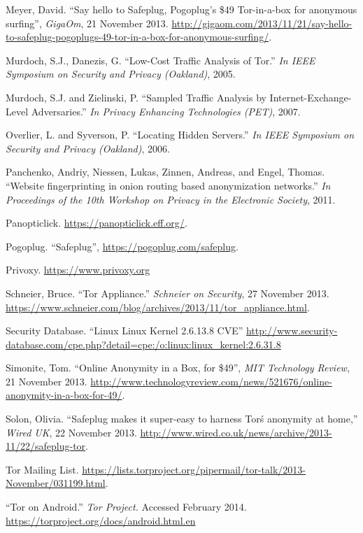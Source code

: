\documentclass[conference]{IEEEtran}
\begin{document}
\begin{thebibliography}{1}
 Meyer, David. ``Say hello to Safeplug, Pogoplug’s \$49 Tor-in-a-box for anonymous surfing'', \emph{GigaOm}, 21 November 2013. \url{http://gigaom.com/2013/11/21/say-hello-to-safeplug-pogoplugs-49-tor-in-a-box-for-anonymous-surfing/}.

 Murdoch, S.J., Danezis, G.  ``Low-Cost Traffic Analysis of Tor.'' \emph{In IEEE Symposium on Security and Privacy (Oakland)}, 2005.

 Murdoch, S.J. and Zielinski, P.  ``Sampled Traffic Analysis by Internet-Exchange-Level Adversaries.'' \emph{In Privacy Enhancing Technologies (PET)}, 2007.

 Overlier, L. and Syverson, P.  ``Locating Hidden Servers.'' \emph{In IEEE Symposium on Security and Privacy (Oakland)}, 2006.

 Panchenko, Andriy, Niessen, Lukas, Zinnen, Andreas, and Engel, Thomas.  ``Website fingerprinting in onion routing based anonymization networks.'' \emph{In Proceedings of the 10th Workshop on Privacy in the Electronic Society}, 2011.

 Panopticlick. \url{https://panopticlick.eff.org/}.

 Pogoplug. ``Safeplug'', \url{https://pogoplug.com/safeplug}.

 Privoxy. \url{https://www.privoxy.org}

 Schneier, Bruce. ``Tor Appliance.'' \emph{Schneier on Security}, 27 November 2013. \url{https://www.schneier.com/blog/archives/2013/11/tor_appliance.html}.

 Security Database. ``Linux Linux Kernel 2.6.13.8 CVE'' \url{http://www.security-database.com/cpe.php?detail=cpe:/o:linux:linux_kernel:2.6.31.8}

 Simonite, Tom. ``Online Anonymity in a Box, for \$49'', \emph{MIT Technology Review}, 21 November 2013. \url{http://www.technologyreview.com/news/521676/online-anonymity-in-a-box-for-49/}.

 Solon, Olivia. ``Safeplug makes it super-easy to harness Tor\'s anonymity at home,'' \emph{Wired UK}, 22 November 2013. \url{http://www.wired.co.uk/news/archive/2013-11/22/safeplug-tor}.

 Tor Mailing List.  \url{https://lists.torproject.org/pipermail/tor-talk/2013-November/031199.html}.

 ``Tor on Android.'' \emph{Tor Project.} Accessed February 2014. \url{https://torproject.org/docs/android.html.en}


\end{thebibliography}
\end{document}
